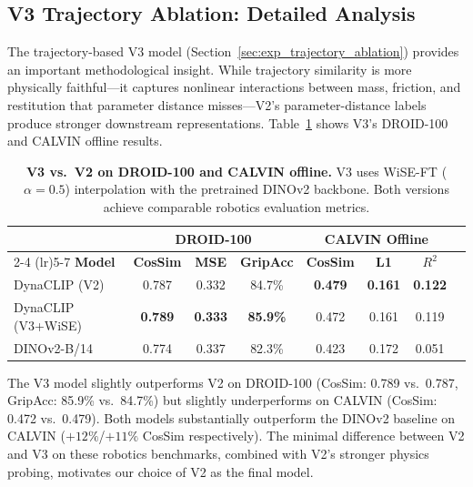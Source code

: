 \documentclass{article}
\newcommand{\methodname}{DynaCLIP}
\newcommand{\best}[1]{\textbf{#1}}
\begin{document}
\subsection{V3 Trajectory Ablation: Detailed Analysis}
\label{app:v3_ablation}

The trajectory-based V3 model (Section~\ref{sec:exp_trajectory_ablation}) provides an important methodological insight. While trajectory similarity is more physically faithful---it captures nonlinear interactions between mass, friction, and restitution that parameter distance misses---V2's parameter-distance labels produce stronger downstream representations. Table~\ref{tab:v3_droid_calvin} shows V3's DROID-100 and CALVIN offline results.

\begin{table}[h]
\centering
\caption{\textbf{V3 vs.\ V2 on DROID-100 and CALVIN offline.} V3 uses WiSE-FT ($\alpha{=}0.5$) interpolation with the pretrained DINOv2 backbone. Both versions achieve comparable robotics evaluation metrics.}
\label{tab:v3_droid_calvin}
\small
\begin{tabular}{@{}lccccccc@{}}
\toprule
& \multicolumn{3}{c}{\textbf{DROID-100}} & \multicolumn{3}{c}{\textbf{CALVIN Offline}} \\
\cmidrule(lr){2-4} \cmidrule(lr){5-7}
\textbf{Model} & \textbf{CosSim} & \textbf{MSE} & \textbf{GripAcc} & \textbf{CosSim} & \textbf{L1} & \textbf{$R^2$} \\
\midrule
\methodname{} (V2) & 0.787 & 0.332 & 84.7\% & \best{0.479} & \best{0.161} & \best{0.122} \\
\methodname{} (V3+WiSE) & \best{0.789} & \best{0.333} & \best{85.9\%} & 0.472 & 0.161 & 0.119 \\
DINOv2-B/14 & 0.774 & 0.337 & 82.3\% & 0.423 & 0.172 & 0.051 \\
\bottomrule
\end{tabular}
\end{table}

The V3 model slightly outperforms V2 on DROID-100 (CosSim: 0.789 vs.\ 0.787, GripAcc: 85.9\% vs.\ 84.7\%) but slightly underperforms on CALVIN (CosSim: 0.472 vs.\ 0.479). Both models substantially outperform the DINOv2 baseline on CALVIN ($+12\%$/$+11\%$ CosSim respectively). The minimal difference between V2 and V3 on these robotics benchmarks, combined with V2's stronger physics probing, motivates our choice of V2 as the final model.
\end{document}
